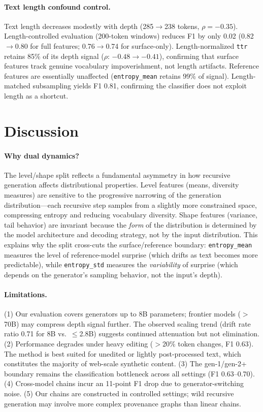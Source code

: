 \documentclass[letterpaper]{article}
\newcommand{\feat}[1]{\texttt{#1}}
\begin{document}
\paragraph{Text length confound control.}
Text length decreases modestly with depth (285$\to$238 tokens, $\rho = -0.35$).
Length-controlled evaluation (200-token windows) reduces F1 by only 0.02 (0.82$\to$0.80 for full features; 0.76$\to$0.74 for surface-only).
Length-normalized \feat{ttr} retains 85\% of its depth signal ($\rho$: $-0.48 \to -0.41$), confirming that surface features track genuine vocabulary impoverishment, not length artifacts.
Reference features are essentially unaffected (\feat{entropy\_mean} retains 99\% of signal).
Length-matched subsampling yields F1 0.81, confirming the classifier does not exploit length as a shortcut.

\section{Discussion}

\paragraph{Why dual dynamics?}
The level/shape split reflects a fundamental asymmetry in how recursive generation affects distributional properties.
Level features (means, diversity measures) are sensitive to the progressive narrowing of the generation distribution---each recursive step samples from a slightly more constrained space, compressing entropy and reducing vocabulary diversity.
Shape features (variance, tail behavior) are invariant because the \emph{form} of the distribution is determined by the model architecture and decoding strategy, not by the input distribution.
This explains why the split cross-cuts the surface/reference boundary: \feat{entropy\_mean} measures the level of reference-model surprise (which drifts as text becomes more predictable), while \feat{entropy\_std} measures the \emph{variability} of surprise (which depends on the generator's sampling behavior, not the input's depth).

\paragraph{Limitations.}
(1) Our evaluation covers generators up to 8B parameters; frontier models ($>$70B) may compress depth signal further.
The observed scaling trend (drift rate ratio 0.71 for 8B vs.\ $\leq$2.8B) suggests continued attenuation but not elimination.
(2) Performance degrades under heavy editing ($>$20\% token changes, F1 0.63).
The method is best suited for unedited or lightly post-processed text, which constitutes the majority of web-scale synthetic content.
(3) The gen-1/gen-2+ boundary remains the classification bottleneck across all settings (F1 0.63--0.70).
(4) Cross-model chains incur an 11-point F1 drop due to generator-switching noise.
(5) Our chains are constructed in controlled settings; wild recursive generation may involve more complex provenance graphs than linear chains.
\end{document}
